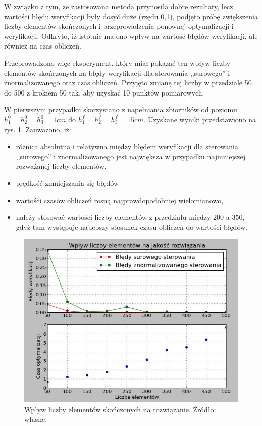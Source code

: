 W związku z tym, że zastosowana metoda przynosiła dobre rezultaty, lecz wartości błędu weryfikacji były dosyć duże (rzędu 0,1), podjęto próbę zwiększenia liczby elementów skończonych i przeprowadzenia ponownej optymalizacji i weryfikacji. Odkryto, iż istotnie ma ono wpływ na wartość błędów weryfikacji, ale również na czas obliczeń.

Przeprowadzono więc eksperyment, który miał pokazać ten wpływ liczby elementów skończonych na błędy weryfikacji dla sterowania ,,surowego'' i znormalizowanego oraz czas obliczeń. Przyjęto zmianę tej liczby w przedziale 50 do 500 z krokiem 50 tak, aby uzyskać 10 punktów pomiarowych.

W pierwszym przypadku skorzystano z napełniania zbiorników od poziomu $h_{1}^{0} = h_{2}^{0} = h_{3}^{0} = 1 cm$ do $h_{1}^{f} = h_{2}^{f} = h_{3}^{f} = 15 cm$. Uzyskane wyniki przedstawiono na rys. \ref{fig:elementsinfluence1-15_50-500}. Zauważono, iż:
\begin{itemize}
    \item różnica absolutna i relatywna między błędem weryfikacji dla sterowania ,,surowego'' i znormalizowanego jest największa w przypadku najmniejszej rozważanej liczby elementów,
    \item prędkość zmniejszania się błędów
    \item wartości czasów obliczeń rosną najprawdopodobniej wielomianowo,
    \item należy stosować wartości liczby elementów z przedziału między 200 a 350, gdyż tam występuje najlepszy stosunek czasu obliczeń do wartości błędów.
\end{itemize}

\begin{figure}[ht]
    \centering
    \includegraphics{Grafika/elements_influence_1-15_50-500}
    \caption{Wpływ liczby elementów skończonych na rozwiązanie. Źródło: własne.}
    \label{fig:elementsinfluence1-15_50-500}
\end{figure}

